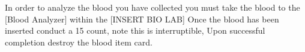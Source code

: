 \documentclass[green]{guildcamp4}
\begin{document}
\name{\gReadBlood{}}

In order to analyze the blood you have collected you must take the blood to the [Blood Analyzer] within the [INSERT BIO LAB] 
Once the blood has been inserted conduct a 15 count, note this is interruptible, 
Upon successful completion destroy the blood item card.
\end{document}
